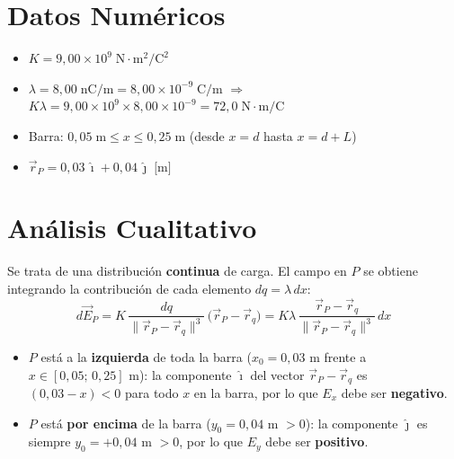\documentclass[12pt,letterpaper]{article}
\begin{document}
\section*{Datos Num\'ericos}

\begin{itemize}
    \item $K = 9{,}00 \times 10^9\;\text{N}\cdot\text{m}^2/\text{C}^2$
    \item $\lambda = 8{,}00\;\text{nC/m} = 8{,}00\times10^{-9}\;\text{C/m}$
    \quad$\Rightarrow$\quad
    $K\lambda = 9{,}00\times10^9 \times 8{,}00\times10^{-9} = 72{,}0\;\text{N}\cdot\text{m}/\text{C}$
    \item Barra: $0{,}05\;\text{m} \le x \le 0{,}25\;\text{m}$ \quad(desde $x = d$ hasta $x = d + L$)
    \item $\vec{r}_P = 0{,}03\,\hat{\imath} + 0{,}04\,\hat{\jmath}\;\text{[m]}$
\end{itemize}

\section*{An\'alisis Cualitativo}

Se trata de una distribuci\'on \textbf{continua} de carga. El campo en $P$ se obtiene integrando la contribuci\'on de cada elemento $dq = \lambda\,dx$:
\begin{equation*}
    d\vec{E}_P
    = K\,\frac{dq}{\|\vec{r}_P - \vec{r}_q\|^3}\,\bigl(\vec{r}_P - \vec{r}_q\bigr)
    = K\lambda\,\frac{\vec{r}_P - \vec{r}_q}{\|\vec{r}_P - \vec{r}_q\|^3}\,dx
\end{equation*}

\begin{itemize}
    \item $P$ est\'a a la \textbf{izquierda} de toda la barra ($x_0 = 0{,}03$ m frente a $x \in [0{,}05;\,0{,}25]$ m):
    la componente $\hat{\imath}$ del vector $\vec{r}_P - \vec{r}_q$ es $(0{,}03 - x) < 0$ para todo $x$ en la barra,
    por lo que $E_x$ debe ser \textbf{negativo}.

    \item $P$ est\'a \textbf{por encima} de la barra ($y_0 = 0{,}04$ m $> 0$):
    la componente $\hat{\jmath}$ es siempre $y_0 = +0{,}04$ m $> 0$,
    por lo que $E_y$ debe ser \textbf{positivo}.
\end{itemize}
\end{document}
